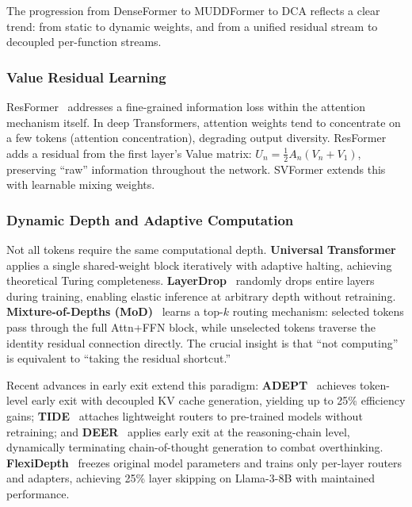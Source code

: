 The progression from DenseFormer to MUDDFormer to DCA reflects a clear trend: from static to dynamic weights, and from a unified residual stream to decoupled per-function streams.

\subsubsection{Value Residual Learning}

ResFormer~\cite{zhou2024value} addresses a fine-grained information loss within the attention mechanism itself. In deep Transformers, attention weights tend to concentrate on a few tokens (attention concentration), degrading output diversity. ResFormer adds a residual from the first layer's Value matrix: $U_n = \frac{1}{2} A_n (V_n + V_1)$, preserving ``raw'' information throughout the network. SVFormer extends this with learnable mixing weights.

\subsubsection{Dynamic Depth and Adaptive Computation}

Not all tokens require the same computational depth. \textbf{Universal Transformer}~\cite{dehghani2019universal} applies a single shared-weight block iteratively with adaptive halting, achieving theoretical Turing completeness. \textbf{LayerDrop}~\cite{fan2020reducing} randomly drops entire layers during training, enabling elastic inference at arbitrary depth without retraining. \textbf{Mixture-of-Depths (MoD)}~\cite{raposo2024mixture} learns a top-$k$ routing mechanism: selected tokens pass through the full Attn+FFN block, while unselected tokens traverse the identity residual connection directly. The crucial insight is that ``not computing'' is equivalent to ``taking the residual shortcut.''

Recent advances in early exit extend this paradigm: \textbf{ADEPT}~\cite{adept2026} achieves token-level early exit with decoupled KV cache generation, yielding up to 25\% efficiency gains; \textbf{TIDE}~\cite{tide2026} attaches lightweight routers to pre-trained models without retraining; and \textbf{DEER}~\cite{deer2025} applies early exit at the reasoning-chain level, dynamically terminating chain-of-thought generation to combat overthinking. \textbf{FlexiDepth}~\cite{luo2025flexidepth} freezes original model parameters and trains only per-layer routers and adapters, achieving 25\% layer skipping on Llama-3-8B with maintained performance.

